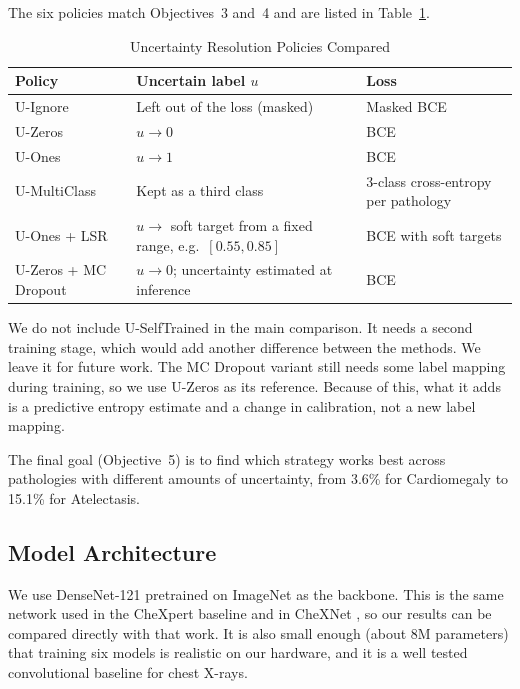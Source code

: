 \documentclass[conference]{IEEEtran}
\begin{document}
The six policies match Objectives~3 and~4 and are listed in Table~\ref{tab:policies}.

\begin{table}[!t]
\centering
\caption{Uncertainty Resolution Policies Compared}
\label{tab:policies}
\small
\begin{tabular}{@{}p{2.1cm}p{3.2cm}p{2.2cm}@{}}
\toprule
\textbf{Policy} & \textbf{Uncertain label $u$} & \textbf{Loss} \\
\midrule
U-Ignore & Left out of the loss (masked) & Masked BCE \\
U-Zeros & $u \rightarrow 0$ & BCE \\
U-Ones & $u \rightarrow 1$ & BCE \\
U-MultiClass & Kept as a third class & 3-class cross-entropy per pathology \\
U-Ones + LSR & $u \rightarrow$ soft target from a fixed range, e.g.\ $[0.55, 0.85]$ \cite{ref5} & BCE with soft targets \\
U-Zeros + MC Dropout & $u \rightarrow 0$; uncertainty estimated at inference \cite{ref8,ref11} & BCE \\
\bottomrule
\end{tabular}
\end{table}

We do not include U-SelfTrained in the main comparison. It needs a second training stage, which would add another difference between the methods. We leave it for future work. The MC Dropout variant still needs some label mapping during training, so we use U-Zeros as its reference. Because of this, what it adds is a predictive entropy estimate and a change in calibration, not a new label mapping.

The final goal (Objective~5) is to find which strategy works best across pathologies with different amounts of uncertainty, from 3.6\% for Cardiomegaly to 15.1\% for Atelectasis.

\subsection{Model Architecture}

We use DenseNet-121 pretrained on ImageNet as the backbone. This is the same network used in the CheXpert baseline \cite{ref1} and in CheXNet \cite{ref2}, so our results can be compared directly with that work. It is also small enough (about 8M parameters) that training six models is realistic on our hardware, and it is a well tested convolutional baseline for chest X-rays.
\end{document}
